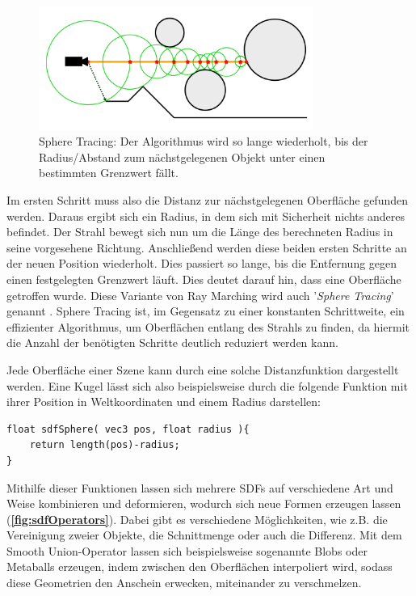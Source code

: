 \begin{figure}[h]
	\centering
	\includegraphics[width=0.80\textwidth]{Grafiken/Basics/Volume/Sphere_Tracing.png}
	\begin{footnotesize}
		\caption{Sphere Tracing: Der Algorithmus wird so lange wiederholt, bis der Radius/Abstand zum nächstgelegenen
			Objekt unter einen bestimmten Grenzwert fällt.}
	\end{footnotesize}
\end{figure}


Im ersten Schritt muss also die Distanz zur nächstgelegenen Oberfläche gefunden werden. Daraus ergibt sich ein Radius, in dem sich
mit Sicherheit nichts anderes befindet. Der Strahl bewegt sich nun um die Länge des berechneten Radius in seine vorgesehene Richtung.
Anschließend werden diese beiden ersten Schritte an der neuen Position wiederholt. Dies passiert so lange, bis die Entfernung gegen einen festgelegten
Grenzwert läuft. Dies deutet darauf hin, dass eine Oberfläche getroffen wurde. Diese Variante von Ray Marching wird auch
'\textit{Sphere Tracing}' genannt \parencite{Hart96}. Sphere Tracing ist, im Gegensatz zu einer konstanten Schrittweite, ein effizienter Algorithmus,
um Oberflächen entlang des Strahls zu finden, da hiermit die Anzahl der benötigten Schritte deutlich reduziert werden kann.

Jede Oberfläche einer Szene kann durch eine solche Distanzfunktion dargestellt werden.
Eine Kugel lässt sich also beispielsweise durch die folgende Funktion mit ihrer Position in Weltkoordinaten und einem Radius darstellen:

\vspace{0.5cm}
\begin{lstlisting}[language={[Sharp]C}, label={lst:sphereSDF}, caption={SDF einer Kugel im Ursprung},captionpos=b, frame=single]
float sdfSphere( vec3 pos, float radius ){
	return length(pos)-radius;
}
\end{lstlisting}

Mithilfe dieser Funktionen lassen sich mehrere SDFs auf verschiedene Art und Weise kombinieren und deformieren, wodurch sich neue Formen
erzeugen lassen (\textbf{\autoref{fig:sdfOperators}}).
Dabei gibt es verschiedene Möglichkeiten, wie z.B. die Vereinigung zweier Objekte, die Schnittmenge oder auch die Differenz.
Mit dem Smooth Union-Operator lassen sich beispielsweise sogenannte Blobs oder Metaballs erzeugen, indem zwischen
den Oberflächen interpoliert wird, sodass diese Geometrien den Anschein erwecken, miteinander zu verschmelzen.

